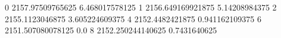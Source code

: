 0 2157.97509765625 6.468017578125
1 2156.649169921875 5.14208984375
2 2155.1123046875 3.605224609375
4 2152.4482421875 0.941162109375
6 2151.507080078125 0.0
8 2152.250244140625 0.7431640625
